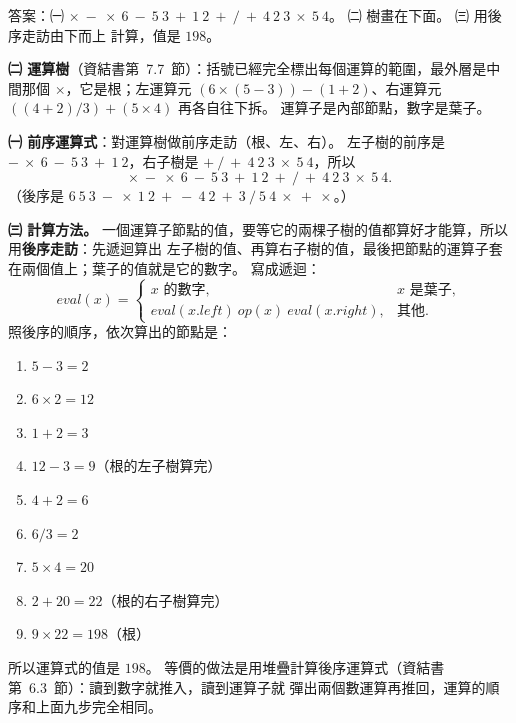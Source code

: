 \begin{pastsoln}
答案：㈠ $\times\ -\ \times\ 6\ -\ 5\ 3\ +\ 1\ 2\ +\ /\ +\ 4\ 2\ 3\ \times\ 5\ 4$。 ㈡ 樹畫在下面。 ㈢ 用後序走訪由下而上
計算，值是 $198$。

\textbf{㈡ 運算樹}（資結書第~7.7~節）：括號已經完全標出每個運算的範圍，最外層是中間那個 $\times$，它是根；左運算元
$(6 \times (5-3)) - (1+2)$、右運算元 $((4+2)/3) + (5 \times 4)$ 再各自往下拆。 運算子是內部節點，數字是葉子。
\begin{center}
\end{center}

\textbf{㈠ 前序運算式}：對運算樹做前序走訪（根、左、右）。 左子樹的前序是 $-\ \times\ 6\ -\ 5\ 3\ +\ 1\ 2$，右子樹是
$+\ /\ +\ 4\ 2\ 3\ \times\ 5\ 4$，所以
\[
\times\ -\ \times\ 6\ -\ 5\ 3\ +\ 1\ 2\ +\ /\ +\ 4\ 2\ 3\ \times\ 5\ 4.
\]
（後序是 $6\ 5\ 3\ -\ \times\ 1\ 2\ +\ -\ 4\ 2\ +\ 3\ /\ 5\ 4\ \times\ +\ \times$。）

\textbf{㈢ 計算方法。} 一個運算子節點的值，要等它的兩棵子樹的值都算好才能算，所以用\textbf{後序走訪}：先遞迴算出
左子樹的值、再算右子樹的值，最後把節點的運算子套在兩個值上；葉子的值就是它的數字。 寫成遞迴：
\[
\mathit{eval}(x) = \begin{cases} x \text{ 的數字}, & x \text{ 是葉子}, \\
\mathit{eval}(x.\mathit{left})\ \mathit{op}(x)\ \mathit{eval}(x.\mathit{right}), & \text{其他}. \end{cases}
\]
照後序的順序，依次算出的節點是：
\begin{enumerate}
\item $5 - 3 = 2$
\item $6 \times 2 = 12$
\item $1 + 2 = 3$
\item $12 - 3 = 9$（根的左子樹算完）
\item $4 + 2 = 6$
\item $6 / 3 = 2$
\item $5 \times 4 = 20$
\item $2 + 20 = 22$（根的右子樹算完）
\item $9 \times 22 = 198$（根）
\end{enumerate}
所以運算式的值是 $198$。 等價的做法是用堆疊計算後序運算式（資結書第~6.3~節）：讀到數字就推入，讀到運算子就
彈出兩個數運算再推回，運算的順序和上面九步完全相同。
\end{pastsoln}
